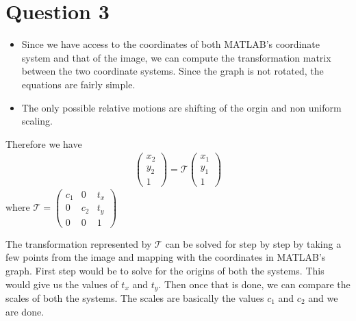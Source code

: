 \documentclass[12pt]{article}
\begin{document}
\section*{Question 3}
    \begin{itemize}
        \item Since we have access to the coordinates of both MATLAB's coordinate system and that of the image, we can compute the 
        transformation matrix between the two coordinate systems. Since the graph is not rotated, the equations are fairly 
        simple.
        \item The only possible relative motions are shifting of the orgin and non uniform scaling.
    \end{itemize}

    Therefore we have 
    \begin{align*}
        \begin{pmatrix}
            x_{2} \\
            y_{2} \\
            1
        \end{pmatrix}
        = \mathcal{T} 
        \begin{pmatrix}
            x_{1} \\
            y_{1} \\
            1
        \end{pmatrix}
    \end{align*}
    where $\mathcal{T} = \begin{pmatrix}
                            c_{1} & 0 & t_{x} \\
                            0  & c_{2} & t_{y} \\
                            0 & 0 & 1
                        \end{pmatrix}$

    The transformation represented by $\mathcal{T}$ can be solved for step by step by taking a few points from the image 
    and mapping with the coordinates in MATLAB's graph. First step would be to solve for the origins of both the systems.
    This would give us the values of $t_{x}$ and $t_{y}$. Then once that is done, we can compare the scales of both 
    the systems. The scales are basically the values $c_{1}$ and $c_{2}$ and we are done.
    
\end{document}
